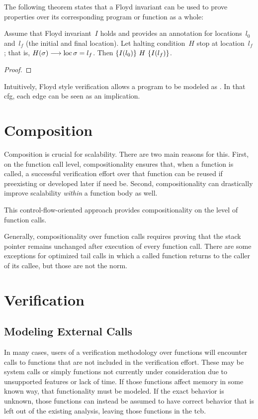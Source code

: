The following theorem states that a Floyd invariant
can be used to prove properties over its corresponding program or function
as a whole:
\begin{theorem}
  Assume that Floyd invariant~$I$ holds and provides an annotation for locations~$l_0$ and~$l_f$ (the initial and final location).
  Let halting condition~$H$ stop at location~$l_f$;
  that is, $H(\sigma)\longrightarrow\operatorname{loc}\sigma=l_f$.
  Then $\{I(l_0)\}~H~\{I(l_f)\}$.
\end{theorem}
\begin{proof}
\end{proof}

Intuitively, Floyd style verification allows a program to be modeled as .
In that \ac{cfg}, each edge can be seen as an implication.

\section{Composition}
Composition is crucial for scalability.
There are two main reasons for this.
First, on the function call level,
compositionality ensures that, when a function is called,
a successful verification effort over that function can be reused
if preexisting or developed later if need be.
Second, compositionality can drastically improve scalability
\emph{within} a function body as well.


This control-flow-oriented approach provides compositionality
on the level of function calls.

Generally, compositionality over function calls requires proving
that the stack pointer remains unchanged after execution of every function call.
There are some exceptions for optimized tail calls
in which a called function returns to the caller of its callee,
but those are not the norm.


\section{Verification}\label{se:cfg_verification}

\subsection{Modeling External Calls}
In many cases, users of a verification methodology over functions
will encounter calls to functions that are not included in the verification effort.
These may be system calls or simply functions not currently under consideration
due to unsupported features or lack of time.
If those functions affect memory in some known way, that functionality must be modeled.
If the exact behavior is unknown,
those functions can instead be assumed to have correct behavior
that is left out of the existing analysis, leaving those functions in the \ac{tcb}.

